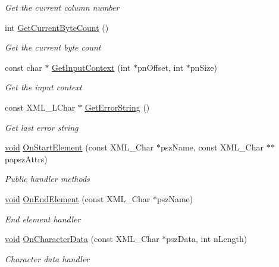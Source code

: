 \begin{DoxyCompactItemize}
\begin{DoxyCompactList}\small\item\em \-Get the current column number \end{DoxyCompactList}\item 
int \hyperlink{class_c_expat_impl_a984d18a346ce61788df2f697e1f3ab61}{\-Get\-Current\-Byte\-Count} ()
\begin{DoxyCompactList}\small\item\em \-Get the current byte count \end{DoxyCompactList}\item 
const char $\ast$ \hyperlink{class_c_expat_impl_a9d270067e041578c57eb71a1238ed717}{\-Get\-Input\-Context} (int $\ast$pn\-Offset, int $\ast$pn\-Size)
\begin{DoxyCompactList}\small\item\em \-Get the input context \end{DoxyCompactList}\item 
const \-X\-M\-L\-\_\-\-L\-Char $\ast$ \hyperlink{class_c_expat_impl_af463b2fa4776e97d9c0f62fc8333f9f6}{\-Get\-Error\-String} ()
\begin{DoxyCompactList}\small\item\em \-Get last error string \end{DoxyCompactList}\item 
\hyperlink{_cpclient_8h_a6464f7480a0fd0ee170cba12b2c0497f}{void} \hyperlink{class_c_expat_impl_a94c5469966d0124253e2b67eda7d59ff}{\-On\-Start\-Element} (const \-X\-M\-L\-\_\-\-Char $\ast$psz\-Name, const \-X\-M\-L\-\_\-\-Char $\ast$$\ast$papsz\-Attrs)
\begin{DoxyCompactList}\small\item\em \-Public handler methods \end{DoxyCompactList}\item 
\hyperlink{_cpclient_8h_a6464f7480a0fd0ee170cba12b2c0497f}{void} \hyperlink{class_c_expat_impl_aaf21a9a335c6daf7814e83006f968fa1}{\-On\-End\-Element} (const \-X\-M\-L\-\_\-\-Char $\ast$psz\-Name)
\begin{DoxyCompactList}\small\item\em \-End element handler \end{DoxyCompactList}\item 
\hyperlink{_cpclient_8h_a6464f7480a0fd0ee170cba12b2c0497f}{void} \hyperlink{class_c_expat_impl_ab97a7933f82395535706fa7a7584c2d4}{\-On\-Character\-Data} (const \-X\-M\-L\-\_\-\-Char $\ast$psz\-Data, int n\-Length)
\begin{DoxyCompactList}\small\item\em \-Character data handler \end{DoxyCompactList}\item 
$$
\end{DoxyCompactItemize}

